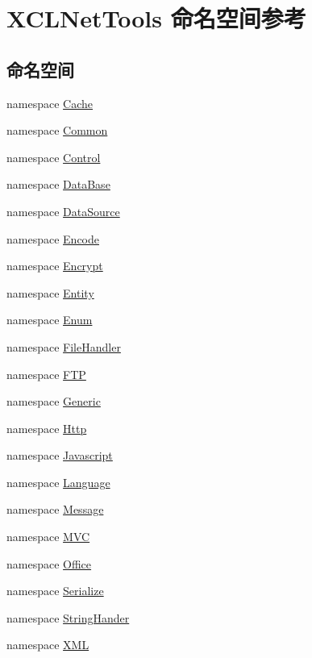 \hypertarget{namespace_x_c_l_net_tools}{}\section{X\+C\+L\+Net\+Tools 命名空间参考}
\label{namespace_x_c_l_net_tools}
\subsection*{命名空间}
\begin{DoxyCompactItemize}
\item 
namespace \hyperlink{namespace_x_c_l_net_tools_1_1_cache}{Cache}
\item 
namespace \hyperlink{namespace_x_c_l_net_tools_1_1_common}{Common}
\item 
namespace \hyperlink{namespace_x_c_l_net_tools_1_1_control}{Control}
\item 
namespace \hyperlink{namespace_x_c_l_net_tools_1_1_data_base}{Data\+Base}
\item 
namespace \hyperlink{namespace_x_c_l_net_tools_1_1_data_source}{Data\+Source}
\item 
namespace \hyperlink{namespace_x_c_l_net_tools_1_1_encode}{Encode}
\item 
namespace \hyperlink{namespace_x_c_l_net_tools_1_1_encrypt}{Encrypt}
\item 
namespace \hyperlink{namespace_x_c_l_net_tools_1_1_entity}{Entity}
\item 
namespace \hyperlink{namespace_x_c_l_net_tools_1_1_enum}{Enum}
\item 
namespace \hyperlink{namespace_x_c_l_net_tools_1_1_file_handler}{File\+Handler}
\item 
namespace \hyperlink{namespace_x_c_l_net_tools_1_1_f_t_p}{F\+TP}
\item 
namespace \hyperlink{namespace_x_c_l_net_tools_1_1_generic}{Generic}
\item 
namespace \hyperlink{namespace_x_c_l_net_tools_1_1_http}{Http}
\item 
namespace \hyperlink{namespace_x_c_l_net_tools_1_1_javascript}{Javascript}
\item 
namespace \hyperlink{namespace_x_c_l_net_tools_1_1_language}{Language}
\item 
namespace \hyperlink{namespace_x_c_l_net_tools_1_1_message}{Message}
\item 
namespace \hyperlink{namespace_x_c_l_net_tools_1_1_m_v_c}{M\+VC}
\item 
namespace \hyperlink{namespace_x_c_l_net_tools_1_1_office}{Office}
\item 
namespace \hyperlink{namespace_x_c_l_net_tools_1_1_serialize}{Serialize}
\item 
namespace \hyperlink{namespace_x_c_l_net_tools_1_1_string_hander}{String\+Hander}
\item 
namespace \hyperlink{namespace_x_c_l_net_tools_1_1_x_m_l}{X\+ML}
\end{DoxyCompactItemize}
